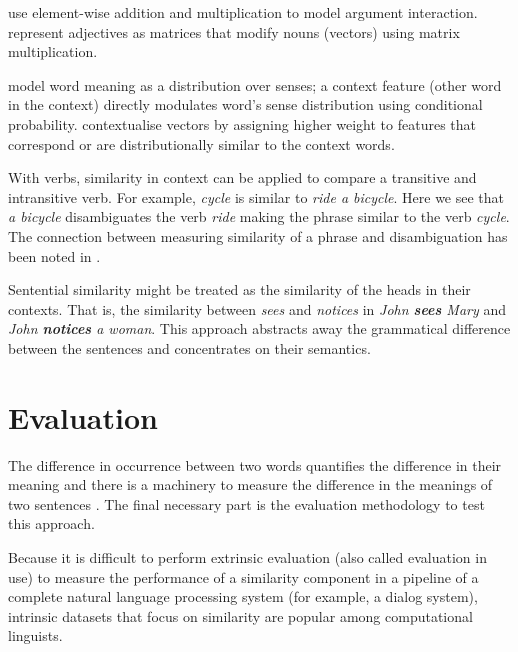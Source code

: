  use element-wise addition and multiplication to model argument interaction.  represent adjectives as matrices that modify nouns (vectors) using matrix multiplication.

 model word meaning as a distribution over senses; a context feature (other word in the context)  directly modulates word’s sense distribution using conditional probability.  contextualise vectors by assigning higher weight to features that correspond or are distributionally similar to the context words.


With verbs, similarity in context can be applied to compare a transitive and intransitive verb. For example, \textit{cycle} is similar to \textit{ride a bicycle}. Here we see that \textit{a bicycle} disambiguates the verb \textit{ride} making the phrase similar to the verb \textit{cycle}. The connection between measuring similarity of a phrase and disambiguation has been noted in .


Sentential similarity might be treated as the similarity of the heads in their contexts. That is, the similarity between \textit{sees} and \textit{notices} in \textit{John \textbf{sees} Mary} and \textit{John \textbf{notices} a woman}. This approach abstracts away the grammatical difference between the sentences and concentrates on their semantics.

\section{Evaluation}
\label{sec:intrinsic-evaluation}

The difference in occurrence between two words quantifies the difference in their meaning \cite{harris1954distributional} and there is a machinery to measure the difference in the meanings of two sentences \cite{DBLP:journals/corr/abs-1003-4394}. The final necessary part is the evaluation methodology to test this approach.

Because it is difficult to perform extrinsic evaluation (also called evaluation in use) to measure the performance of a similarity component in a pipeline of a complete natural language processing system (for example, a dialog system), intrinsic datasets that focus on similarity are popular among computational linguists.

